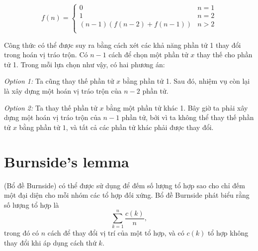 \begin{equation*}
    f(n) = \begin{cases}
               0               & n = 1\\
               1               & n = 2\\
               (n-1)(f(n-2) + f(n-1)) & n>2 \\
           \end{cases}
\end{equation*}

Công thức có thể được suy ra bằng cách xét
các khả năng phần tử 1 thay đổi
trong hoán vị tráo trộn.
Có $n-1$ cách để chọn một phần tử $x$
thay thế cho phần tử 1.
Trong mỗi lựa chọn như vậy, có hai phương án:

\textit{Option 1:} Ta cũng thay thế phần tử $x$
bằng phần tử 1.
Sau đó, nhiệm vụ còn lại là xây dựng
một hoán vị tráo trộn của $n-2$ phần tử.

\textit{Option 2:} Ta thay thế phần tử $x$
bằng một phần tử khác 1.
Bây giờ ta phải xây dựng một hoán vị tráo trộn
của $n-1$ phần tử, bởi vì ta không thể thay thế
phần tử $x$ bằng phần tử $1$, và tất cả các phần tử khác
phải được thay đổi.

\section{Burnside's lemma}


 (Bổ đề Burnside)
có thể được sử dụng để đếm
số lượng tổ hợp sao cho
chỉ đếm một đại diện
cho mỗi nhóm các tổ hợp đối xứng.
Bổ đề Burnside phát biểu rằng số lượng
tổ hợp là
\[\sum_{k=1}^n \frac{c(k)}{n},\]
trong đó có $n$ cách để thay đổi
vị trí của một tổ hợp,
và có $c(k)$ tổ hợp
không thay đổi khi áp dụng cách thứ $k$.

